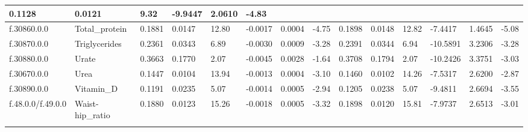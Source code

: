 \begin{longtable}{llllllllllllll}
  \multicolumn{1}{l|}{0.1128} &
  \multicolumn{1}{l|}{0.0121} &
  \multicolumn{1}{l|}{9.32} &
  \multicolumn{1}{l|}{-9.9447} &
  \multicolumn{1}{l|}{2.0610} &
  \multicolumn{1}{l|}{-4.83} \\ \hline
\multicolumn{1}{|l|}{f.30860.0.0} &
  \multicolumn{1}{l|}{Total\_protein} &
  \multicolumn{1}{l|}{0.1881} &
  \multicolumn{1}{l|}{0.0147} &
  \multicolumn{1}{l|}{12.80} &
  \multicolumn{1}{l|}{-0.0017} &
  \multicolumn{1}{l|}{0.0004} &
  \multicolumn{1}{l|}{-4.75} &
  \multicolumn{1}{l|}{0.1898} &
  \multicolumn{1}{l|}{0.0148} &
  \multicolumn{1}{l|}{12.82} &
  \multicolumn{1}{l|}{-7.4417} &
  \multicolumn{1}{l|}{1.4645} &
  \multicolumn{1}{l|}{-5.08} \\ \hline
\multicolumn{1}{|l|}{f.30870.0.0} &
  \multicolumn{1}{l|}{Triglycerides} &
  \multicolumn{1}{l|}{0.2361} &
  \multicolumn{1}{l|}{0.0343} &
  \multicolumn{1}{l|}{6.89} &
  \multicolumn{1}{l|}{-0.0030} &
  \multicolumn{1}{l|}{0.0009} &
  \multicolumn{1}{l|}{-3.28} &
  \multicolumn{1}{l|}{0.2391} &
  \multicolumn{1}{l|}{0.0344} &
  \multicolumn{1}{l|}{6.94} &
  \multicolumn{1}{l|}{-10.5891} &
  \multicolumn{1}{l|}{3.2306} &
  \multicolumn{1}{l|}{-3.28} \\ \hline
\multicolumn{1}{|l|}{f.30880.0.0} &
  \multicolumn{1}{l|}{Urate} &
  \multicolumn{1}{l|}{0.3663} &
  \multicolumn{1}{l|}{0.1770} &
  \multicolumn{1}{l|}{2.07} &
  \multicolumn{1}{l|}{-0.0045} &
  \multicolumn{1}{l|}{0.0028} &
  \multicolumn{1}{l|}{-1.64} &
  \multicolumn{1}{l|}{0.3708} &
  \multicolumn{1}{l|}{0.1794} &
  \multicolumn{1}{l|}{2.07} &
  \multicolumn{1}{l|}{-10.2426} &
  \multicolumn{1}{l|}{3.3751} &
  \multicolumn{1}{l|}{-3.03} \\ \hline
\multicolumn{1}{|l|}{f.30670.0.0} &
  \multicolumn{1}{l|}{Urea} &
  \multicolumn{1}{l|}{0.1447} &
  \multicolumn{1}{l|}{0.0104} &
  \multicolumn{1}{l|}{13.94} &
  \multicolumn{1}{l|}{-0.0013} &
  \multicolumn{1}{l|}{0.0004} &
  \multicolumn{1}{l|}{-3.10} &
  \multicolumn{1}{l|}{0.1460} &
  \multicolumn{1}{l|}{0.0102} &
  \multicolumn{1}{l|}{14.26} &
  \multicolumn{1}{l|}{-7.5317} &
  \multicolumn{1}{l|}{2.6200} &
  \multicolumn{1}{l|}{-2.87} \\ \hline
\multicolumn{1}{|l|}{f.30890.0.0} &
  \multicolumn{1}{l|}{Vitamin\_D} &
  \multicolumn{1}{l|}{0.1191} &
  \multicolumn{1}{l|}{0.0235} &
  \multicolumn{1}{l|}{5.07} &
  \multicolumn{1}{l|}{-0.0014} &
  \multicolumn{1}{l|}{0.0005} &
  \multicolumn{1}{l|}{-2.94} &
  \multicolumn{1}{l|}{0.1205} &
  \multicolumn{1}{l|}{0.0238} &
  \multicolumn{1}{l|}{5.07} &
  \multicolumn{1}{l|}{-9.4811} &
  \multicolumn{1}{l|}{2.6694} &
  \multicolumn{1}{l|}{-3.55} \\ \hline
f.48.0.0/f.49.0.0 &
  Waist-hip\_ratio &
  0.1880 &
  0.0123 &
  15.26 &
  -0.0018 &
  0.0005 &
  -3.32 &
  0.1898 &
  0.0120 &
  15.81 &
  -7.9737 &
  2.6513 &
  -3.01 \\ \hline
  \label{table:4.1}
\end{longtable}
